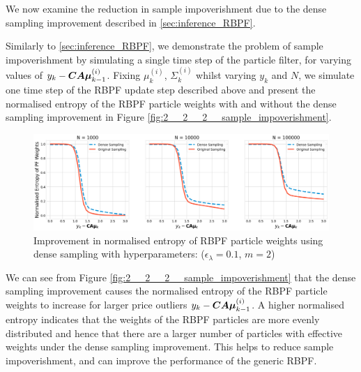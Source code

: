 \documentclass[../main.tex]{subfiles}
\begin{document}
We now examine the reduction in sample impoverishment due to the dense sampling improvement described in \autoref{sec:inference_RBPF}. 

Similarly to \autoref{sec:inference_RBPF}, we demonstrate the problem of sample impoverishment by simulating a single time step of the particle filter, for varying values of $y_k - \bm{CA\mu}_{k-1}^{(i)}$. Fixing $\mu_k^{(i)}$, $\Sigma_k^{(i)}$ whilst varying $y_k$ and $N$, we simulate one time step of the RBPF update step described above and present the normalised entropy of the RBPF particle weights with and without the dense sampling improvement in Figure \ref{fig:2__2__2__sample_impoverishment}.

\begin{figure}[h!]
	\centering
	\includegraphics[width=15.0cm]{../plots/4__1__1__dense_sampling.png}
	\caption{Improvement in normalised entropy of RBPF particle weights using dense sampling with hyperparameters: ($\epsilon_\lambda = 0.1$, $m=2$)}
	\label{fig:4__1__1__dense_sampling}
\end{figure}	

We can see from Figure \ref{fig:2__2__2__sample_impoverishment} that the dense sampling improvement causes the normalised entropy of the RBPF particle weights to increase for larger price outliers $y_k - \bm{CA\mu}_{k-1}^{(i)}$. A higher normalised entropy indicates that the weights of the RBPF particles are more evenly distributed and hence that there are a larger number of particles with effective weights under the dense sampling improvement. This helps to reduce sample impoverishment, and can improve the performance of the generic RBPF. 
	
\end{document}
